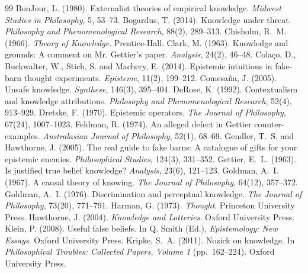 \documentclass{situationist-preprint}
\begin{document}
\begin{thebibliography}{99}\small
{} BonJour, L. (1980). Externalist theories of empirical knowledge. \emph{Midwest Studies in Philosophy}, 5, 53--73.
 Bogardus, T. (2014). Knowledge under threat. \emph{Philosophy and Phenomenological Research}, 88(2), 289--313.
 Chisholm, R.~M. (1966). \emph{Theory of Knowledge}. Prentice-Hall.
 Clark, M. (1963). Knowledge and grounds: A comment on Mr. Gettier's paper. \emph{Analysis}, 24(2), 46--48.
 Cola{\c c}o, D., Buckwalter, W., Stich, S. and Machery, E. (2014). Epistemic intuitions in fake-barn thought experiments. \emph{Episteme}, 11(2), 199--212.
 Comesa{\~n}a, J. (2005). Unsafe knowledge. \emph{Synthese}, 146(3), 395--404.
 DeRose, K. (1992). Contextualism and knowledge attributions. \emph{Philosophy and Phenomenological Research}, 52(4), 913--929.
 Dretske, F. (1970). Epistemic operators. \emph{The Journal of Philosophy}, 67(24), 1007--1023.
 Feldman, R. (1974). An alleged defect in Gettier counter-examples. \emph{Australasian Journal of Philosophy}, 52(1), 68--69.
 Gendler, T.~S. and Hawthorne, J. (2005). The real guide to fake barns: A catalogue of gifts for your epistemic enemies. \emph{Philosophical Studies}, 124(3), 331--352.
 Gettier, E.~L. (1963). Is justified true belief knowledge? \emph{Analysis}, 23(6), 121--123.
 Goldman, A.~I. (1967). A causal theory of knowing. \emph{The Journal of Philosophy}, 64(12), 357--372.
 Goldman, A.~I. (1976). Discrimination and perceptual knowledge. \emph{The Journal of Philosophy}, 73(20), 771--791.
 Harman, G. (1973). \emph{Thought}. Princeton University Press.
 Hawthorne, J. (2004). \emph{Knowledge and Lotteries}. Oxford University Press.
 Klein, P. (2008). Useful false beliefs. In Q. Smith (Ed.), \emph{Epistemology: New Essays}. Oxford University Press.
 Kripke, S.~A. (2011). Nozick on knowledge. In \emph{Philosophical Troubles: Collected Papers, Volume 1} (pp.~162--224). Oxford University Press.

\end{thebibliography}
\end{document}
